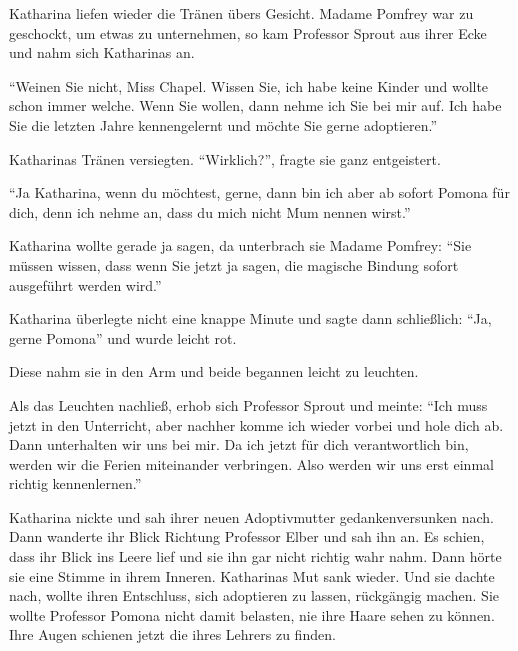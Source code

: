 Katharina liefen wieder die Tränen übers Gesicht. Madame Pomfrey war zu geschockt, um etwas zu unternehmen, so kam Professor Sprout aus ihrer Ecke und nahm sich Katharinas an.

\enquote{Weinen Sie nicht, Miss Chapel. Wissen Sie, ich habe keine Kinder und wollte schon immer welche. Wenn Sie wollen, dann nehme ich Sie bei mir auf. Ich habe Sie die letzten Jahre kennengelernt und möchte Sie gerne adoptieren.}

Katharinas Tränen versiegten. \enquote{Wirklich?}, fragte sie ganz entgeistert.

\enquote{Ja Katharina, wenn du möchtest, gerne, dann bin ich aber ab sofort Pomona für dich, denn ich nehme an, dass du mich nicht Mum nennen wirst.}

Katharina wollte gerade ja sagen, da unterbrach sie Madame Pomfrey: \enquote{Sie müssen wissen, dass wenn Sie jetzt ja sagen, die magische Bindung sofort ausgeführt werden wird.}

Katharina überlegte nicht eine knappe Minute und sagte dann schließlich: \enquote{Ja, gerne \gst Pomona} und wurde leicht rot.

Diese nahm sie in den Arm und beide begannen leicht zu leuchten.

Als das Leuchten nachließ, erhob sich Professor Sprout und meinte: \enquote{Ich muss jetzt in den Unterricht, aber nachher komme ich wieder vorbei und hole dich ab. Dann unterhalten wir uns bei mir. Da ich jetzt für dich verantwortlich bin, werden wir die Ferien miteinander verbringen. Also werden wir uns erst einmal richtig kennenlernen.}

Katharina nickte und sah ihrer neuen Adoptivmutter gedankenversunken nach. Dann wanderte ihr Blick Richtung Professor Elber und sah ihn an. Es schien, dass ihr Blick ins Leere lief und sie ihn gar nicht richtig wahr nahm. Dann hörte sie eine Stimme in ihrem Inneren.  Katharinas Mut sank wieder. Und sie dachte nach, wollte ihren Entschluss, sich adoptieren zu lassen, rückgängig machen. Sie wollte Professor \gst Pomona nicht damit belasten, nie ihre Haare sehen zu können.  Ihre Augen schienen jetzt die ihres Lehrers zu finden. 

